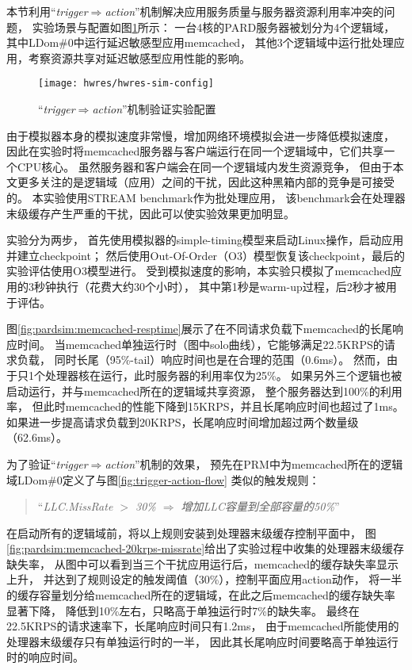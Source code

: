 本节利用``\emph{trigger$\Rightarrow$action}''机制解决应用服务质量与服务器资源利用率冲突的问题，
实验场景与配置如图\ref{fig:hwres-sim-config}所示：
一台4核的PARD服务器被划分为4个逻辑域，其中LDom\#0中运行延迟敏感型应用memcached，
其他3个逻辑域中运行批处理应用，考察资源共享对延迟敏感型应用性能的影响。

\begin{figure}[tb]
  \centering
  \texttt{[image: hwres/hwres-sim-config]}
  \caption{``\emph{trigger$\Rightarrow$action}''机制验证实验配置}
  \label{fig:hwres-sim-config}
\end{figure}

由于模拟器本身的模拟速度非常慢，增加网络环境模拟会进一步降低模拟速度，
因此在实验时将memcached服务器与客户端运行在同一个逻辑域中，它们共享一个CPU核心。
虽然服务器和客户端会在同一个逻辑域内发生资源竞争，
但由于本文更多关注的是逻辑域（应用）之间的干扰，因此这种黑箱内部的竞争是可接受的。
本实验使用STREAM benchmark\cite{stream}作为批处理应用，
该benchmark会在处理器末级缓存产生严重的干扰，因此可以使实验效果更加明显。

实验分为两步，
首先使用模拟器的simple-timing模型来启动Linux操作，启动应用并建立checkpoint；
然后使用Out-Of-Order（O3）模型恢复该checkpoint，最后的实验评估使用O3模型进行。
受到模拟速度的影响，本实验只模拟了memcached应用的3秒钟执行（花费大约30个小时），
其中第1秒是warm-up过程，后2秒才被用于评估。

图\ref{fig:pardsim:memcached-resptime}展示了在不同请求负载下memcached的长尾响应时间。
当memcached单独运行时（图中solo曲线），它能够满足22.5KRPS的请求负载，
同时长尾（95\%-tail）响应时间也是在合理的范围（0.6ms）。
然而，由于只1个处理器核在运行，此时服务器的利用率仅为25\%。
如果另外三个逻辑也被启动运行，并与memcached所在的逻辑域共享资源，
整个服务器达到100\%的利用率，
但此时memcached的性能下降到15KRPS，并且长尾响应时间也超过了1ms。
如果进一步提高请求负载到20KRPS，长尾响应时间增加超过两个数量级（62.6ms）。

为了验证``\emph{trigger$\Rightarrow$action}''机制的效果，
预先在PRM中为memcached所在的逻辑域LDom\#0定义了与图\ref{fig:trigger-action-flow}
类似的触发规则：
\begin{verse}
``\emph{LLC.MissRate $>$ 30\% $\Rightarrow$ 增加LLC容量到全部容量的50\%}''
\end{verse}

在启动所有的逻辑域前，将以上规则安装到处理器末级缓存控制平面中，
图\ref{fig:pardsim:memcached-20krps-missrate}给出了实验过程中收集的处理器末级缓存缺失率，
从图中可以看到当三个干扰应用运行后，memcached的缓存缺失率显示上升，
并达到了规则设定的触发阈值（30\%），控制平面应用action动作，
将一半的缓存容量划分给memcached所在的逻辑域，在此之后memcached的缓存缺失率显著下降，
降低到10\%左右，只略高于单独运行时7\%的缺失率。
最终在22.5KRPS的请求速率下，长尾响应时间只有1.2ms，
由于memcached所能使用的处理器末级缓存只有单独运行时的一半，
因此其长尾响应时间要略高于单独运行时的响应时间。

